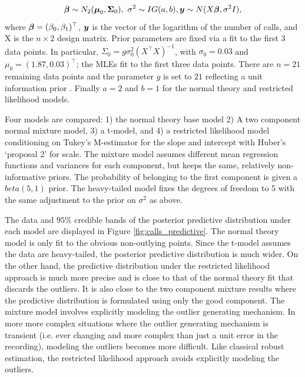 \documentclass[12pt]{article}
\def\bbeta{\mbox{\boldmath $\beta$}}
\newcommand{\by}{\mbox{\boldmath $y$}}
\begin{document}
\begin{equation}
{\boldsymbol{\beta}}\sim N_{2}(\boldsymbol{\mu}_{0}, \boldsymbol{\Sigma}_{0}),\  \sigma^{2} \sim IG(a, b), \by \sim N(X\boldsymbol{\beta}, \sigma^{2} I),
\end{equation}
where $\bbeta = (\beta_{0}, \beta_{1})^{\top}$, $\by$ is the vector of the logarithm of the number of calls, and X is the $n\times 2$ design matrix.  Prior parameters are fixed via a fit to the first 3 data points. In particular, $\Sigma_{0} = g\sigma_{0}^2 (X^{\top}X)^{-1}$, with $\sigma_{0} = 0.03$ and $\mu_{0} = (1.87,  0.03)^{\top}$; the MLEs fit to the first three data points. There are $n=21$ remaining data points and the parameter $g$ is set to $21$ reflecting a unit information prior \cite{}. Finally $a = 2$ and $b =1$ for the normal theory and restricted likelihood models. 

Four models are compared: 1) the normal theory base model 2) A two component normal mixture model, 3) a t-model, and 4) a restricted likelihood model conditioning on Tukey's M-estimator for the slope and intercept with Huber's `proposal 2'  for scale. The mixture model assumes different mean regression functions and variances for each component, but keeps the same, relatively non-informative priors. The probability of belonging to the first component is given a $beta(5,1)$ prior. The heavy-tailed model fixes the degrees of freedom to 5 with the same adjustment to the prior on $\sigma^{2}$ as above. 

The data and  $95\%$ credible bands of the posterior predictive distribution under each model are displayed in Figure \ref{fig:calls_predictive}. The normal theory model is only fit to the obvious non-outlying points. Since the t-model assumes the data are heavy-tailed, the posterior predictive distribution is much wider. On the other hand, the predictive distribution under the restricted likelihood approach is much more precise and is close to that of the normal theory fit that discards the outliers. It is also close to the two component mixture results where the predictive distribution is formulated using only the good component. The mixture model involves explicitly modeling the outlier generating mechanism. In more more complex situations where the outlier generating mechanism is transient (i.e. ever changing and more complex than just a unit error in the recording), modeling the outliers becomes more difficult. Like classical robust estimation, the restricted likelihood approach avoids explicitly modeling the outliers. 
\end{document}
